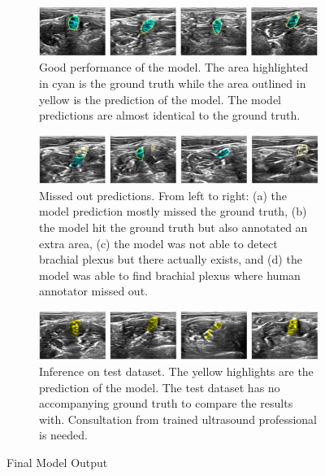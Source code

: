 \documentclass{article}
\begin{document}
\begin{figure}[ht]
    \centering
    \begin{subfigure}[b]{1.0\linewidth}
        \includegraphics[width=1.0\linewidth]{figures/result_1.png}
        \caption{Good performance of the model. The area highlighted in cyan is the ground truth while the area outlined in yellow is the prediction of the model. The model predictions are almost identical to the ground truth.}
        \label{fig:result_1}
    \end{subfigure}
    
    \begin{subfigure}[b]{1.0\linewidth}
        \includegraphics[width=1.0\linewidth]{figures/result_2.png}
        \caption{Missed out predictions. From left to right: (a) the model prediction mostly missed the ground truth, (b) the model hit the ground truth but also annotated an extra area, (c) the model was not able to detect brachial plexus but there actually exists, and (d) the model was able to find brachial plexus where human annotator missed out.}
        \label{fig:result_2}
    \end{subfigure}
    
    \begin{subfigure}[b]{1.0\linewidth}
        \includegraphics[width=1.0\linewidth]{figures/result_3.png}
        \caption{Inference on test dataset. The yellow highlights are the prediction of the model. The test dataset has no accompanying ground truth to compare the results with. Consultation from trained ultrasound professional is needed.}
        \label{fig:result_3}
    \end{subfigure}


    \caption{Final Model Output}
    \label{fig:result}
\end{figure}


\bigskip






\end{document}
